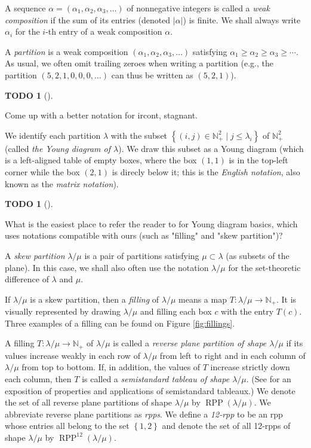 \documentclass[numbers=enddot,12pt,final,onecolumn,notitlepage]{scrartcl}%
\theoremstyle{definition}
\newtheorem{quest}[theo]{TODO}
\newenvironment{todo}[1][]
{\begin{quest}[#1]\begin{leftbar}}
{\end{leftbar}\end{quest}}
\newcommand{\Nplus}{\mathbb{N}_{+}}
\def\lm{{\lambda/\mu}}
\def\OneTwoRPP{{\operatorname*{RPP}^{12}\left(  \lambda/\mu\right)}}
\begin{document}
 A sequence $\alpha=\left(\alpha_{1},\alpha_{2},\alpha_{3},\ldots\right)$ of nonnegative integers is called a \textit{weak composition} if the sum of its entries (denoted $\left\vert \alpha\right\vert$) is finite.
 We shall always write $\alpha_i$ for the $i$-th entry of a weak composition $\alpha$.



A \textit{partition} is a weak composition $\left(  \alpha_{1},\alpha
_{2},\alpha_{3},\ldots\right)  $ satisfying $\alpha_{1}\geq\alpha_{2}
\geq\alpha_{3}\geq\cdots$.
As usual, we often omit trailing zeroes when writing a partition (e.g.,
the partition $\left(5,2,1,0,0,0,\ldots\right)$ can thus be written as
$\left(5,2,1\right)$).

\begin{todo}
 Come up with a better notation for ircont, stagnant.
\end{todo}

We identify each partition $\lambda$ with the subset
$\left\{ \left( i, j \right) \in \Nplus^2 \mid j \leq \lambda_i \right\}$
of $\Nplus^{2}$ (called \textit{the Young diagram of $\lambda$}).
We draw this subset as a Young diagram (which is a left-aligned table of
empty boxes, where the box $(1,1)$ is in the top-left corner while the
box $(2,1)$ is direcly below it; this is the \textit{English notation},
also known as the \textit{matrix notation}).


\begin{todo}
What is the easiest place to refer the reader to for Young diagram basics,
which uses notations compatible with ours (such as "filling" and "skew
partition")?
\end{todo}

A \textit{skew partition} $\lambda/\mu$ is a pair of partitions satisfying $\mu\subset\lambda$ (as subsets of the plane). In this case, we shall also often use the notation $\lambda/\mu$ for the set-theoretic difference of $\lambda$ and $\mu$.

 If $\lm$ is a skew partition, then a \textit{filling} of $\lm$ means a map $T:\lm\rightarrow\Nplus$. It is visually represented by drawing $\lm$ and filling each box $c$ with the entry $T(c)$. Three examples of a filling can be found on Figure \ref{fig:fillings}.
 

 A filling $T:\lm\rightarrow\Nplus$ of $\lm$ is called a \textit{reverse plane partition of shape $\lm$} if its values increase weakly in each row of $\lm$ from left to right and in each column of $\lm$ from top to bottom. If, in addition, the values of $T$ increase strictly down each column, then $T$ is called a \textit{semistandard tableau of shape $\lm$}. (See \cite{Fulton97} for an exposition of properties and applications of semistandard tableaux.) We denote the set of all reverse plane partitions of shape $\lm$ by $\operatorname*{RPP}\left(  \lambda/\mu\right)$.  We abbreviate reverse plane partitions as \textit{rpps}. We define a \textit{12-rpp} to be an rpp whose entries all belong to the set $\left\{  1,2\right\}  $ and denote the set of all 12-rpps of shape $\lm$ by  $\OneTwoRPP$. 
 
\end{document}
